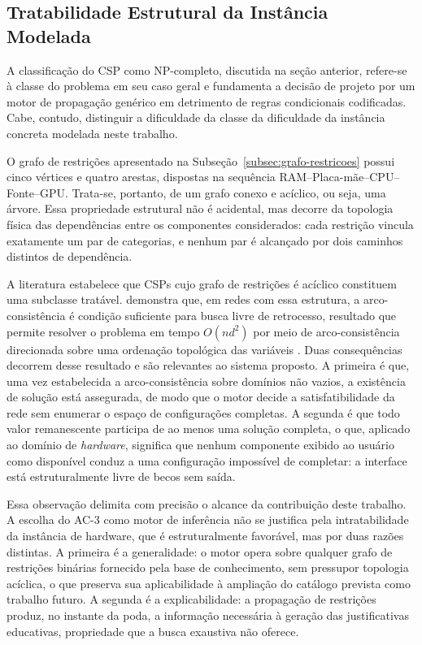\subsection{Tratabilidade Estrutural da Instância Modelada}
\label{subsec:tratabilidade}

A classificação do CSP como NP-completo, discutida na seção anterior,
refere-se à classe do problema em seu caso geral e fundamenta a decisão de
projeto por um motor de propagação genérico em detrimento de regras
condicionais codificadas. Cabe, contudo, distinguir a dificuldade da classe
da dificuldade da instância concreta modelada neste trabalho.

O grafo de restrições apresentado na Subseção~\ref{subsec:grafo-restricoes} possui cinco vértices e
quatro arestas, dispostas na sequência RAM--Placa-mãe--CPU--Fonte--GPU.
Trata-se, portanto, de um grafo conexo e acíclico, ou seja, uma árvore. Essa
propriedade estrutural não é acidental, mas decorre da topologia física das
dependências entre os componentes considerados: cada restrição vincula
exatamente um par de categorias, e nenhum par é alcançado por dois caminhos
distintos de dependência.

A literatura estabelece que CSPs cujo grafo de restrições é acíclico constituem uma subclasse tratável.
\textcite{Freuder1982} demonstra que, em redes com essa estrutura, a arco-consistência é condição suficiente para
busca livre de retrocesso, resultado que permite resolver o problema em tempo $O(nd^2)$ por meio de
arco-consistência direcionada sobre uma ordenação topológica das variáveis \cite{Russell2010,Dechter2003}. Duas
consequências decorrem desse resultado e são relevantes ao sistema proposto. A primeira é que, uma vez estabelecida
a arco-consistência sobre domínios não vazios, a existência de solução está assegurada, de modo que o motor decide a
satisfatibilidade da rede sem enumerar o espaço de configurações completas. A segunda é que todo valor remanescente
participa de ao menos uma solução completa, o que, aplicado ao domínio de \textit{hardware}, significa que nenhum
componente exibido ao usuário como disponível conduz a uma configuração impossível de completar: a interface está
estruturalmente livre de becos sem saída.

Essa observação delimita com precisão o alcance da contribuição deste
trabalho. A escolha do AC-3 como motor de inferência não se justifica pela
intratabilidade da instância de hardware, que é estruturalmente favorável,
mas por duas razões distintas. A primeira é a generalidade: o motor opera
sobre qualquer grafo de restrições binárias fornecido pela base de
conhecimento, sem pressupor topologia acíclica, o que preserva sua
aplicabilidade à ampliação do catálogo prevista como trabalho futuro. A
segunda é a explicabilidade: a propagação de restrições produz, no instante
da poda, a informação necessária à geração das justificativas educativas,
propriedade que a busca exaustiva não oferece.

